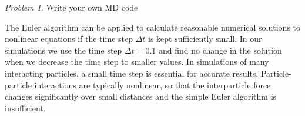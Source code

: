 \documentclass[preprint,showpacs,preprintnumbers,amsmath,amssymb,aps,prb]{revtex4-1}
\theoremstyle{remark}
\newtheorem{problem}{Problem}
\begin{document}
\begin{problem}{Write your own MD code}
\begin{enumerate}
    
  \end{enumerate}

  The Euler algorithm can be applied to
  calculate reasonable numerical solutions to 
  nonlinear
  equations if the time step $\Delta t$
  is kept sufficiently small.\cite{Newman}
  In our simulations we use the time step $\Delta t = 0.1$
  and find no change in the solution
  when we decrease the time step to smaller values.
  In simulations of
  many interacting particles,
  a small
  time step is essential for accurate results.
  Particle-particle interactions are typically nonlinear,
  so that the interparticle force changes significantly over small distances and the simple Euler algorithm is insufficient.
  
\end{problem}
\end{document}
